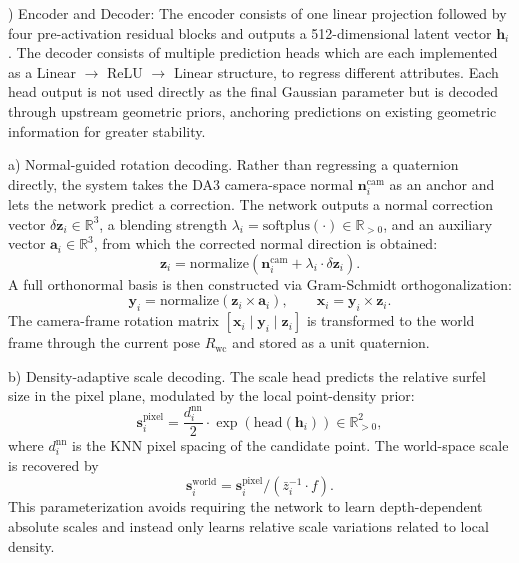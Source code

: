 \documentclass[letterpaper,journal]{IEEEtran}
\begin{document}
\vspace{0.35em}
) Encoder and Decoder: The encoder consists of one linear projection followed by four pre-activation residual blocks and outputs a 512-dimensional latent vector $\mathbf{h}_i$. The decoder consists of multiple prediction heads which are each implemented as a Linear $\to$ ReLU $\to$ Linear structure, to regress different attributes. Each head output is not used directly as the final Gaussian parameter but is decoded through upstream geometric priors, anchoring predictions on existing geometric information for greater stability.

\vspace{0.25em}
\noindent a) Normal-guided rotation decoding. Rather than regressing a quaternion directly, the system takes the DA3 camera-space normal $\mathbf{n}_i^{\text{cam}}$ as an anchor and lets the network predict a correction. The network outputs a normal correction vector $\delta \mathbf{z}_i \in \mathbb{R}^3$, a blending strength $\lambda_i = \text{softplus}(\cdot) \in \mathbb{R}_{>0}$, and an auxiliary vector $\mathbf{a}_i \in \mathbb{R}^3$, from which the corrected normal direction is obtained:
%
\begin{equation}
\mathbf{z}_i = \text{normalize}(\mathbf{n}_i^{\text{cam}} + \lambda_i \cdot \delta \mathbf{z}_i).
\end{equation}
%
A full orthonormal basis is then constructed via Gram-Schmidt orthogonalization:
%
\begin{equation}
\mathbf{y}_i = \text{normalize}(\mathbf{z}_i \times \mathbf{a}_i), \qquad \mathbf{x}_i = \mathbf{y}_i \times \mathbf{z}_i.
\end{equation}
%
The camera-frame rotation matrix $[\mathbf{x}_i \mid \mathbf{y}_i \mid \mathbf{z}_i]$ is transformed to the world frame through the current pose $R_{\text{wc}}$ and stored as a unit quaternion.

\vspace{0.25em}
\noindent b) Density-adaptive scale decoding. The scale head predicts the relative surfel size in the pixel plane, modulated by the local point-density prior:
%
\begin{equation}
\mathbf{s}_i^{\text{pixel}} = \frac{d_i^{\text{nn}}}{2} \cdot \exp(\text{head}(\mathbf{h}_i)) \in \mathbb{R}^2_{>0},
\end{equation}
%
where $d_i^{\text{nn}}$ is the KNN pixel spacing of the candidate point. The world-space scale is recovered by
%
\begin{equation}
\mathbf{s}_i^{\text{world}} = \mathbf{s}_i^{\text{pixel}} / (\bar{z}_i^{-1} \cdot f).
\end{equation}
%
This parameterization avoids requiring the network to learn depth-dependent absolute scales and instead only learns relative scale variations related to local density.
\end{document}
